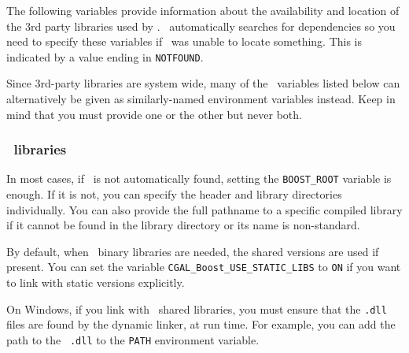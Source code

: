 The following variables provide information about the availability and
location of the 3rd party libraries used by \cgal. \cmake\ automatically
searches for dependencies so you need to specify these variables if 
\cmake\ was unable to locate something. This is indicated by a value ending in
\texttt{NOTFOUND}.

Since 3rd-party libraries are system wide, many of the \cmake\ variables listed below can alternatively
be given as similarly-named environment variables instead. Keep in mind that you must provide one or the
other but never both.

\subsubsection{\boost\ libraries}

In most cases, if \boost\ is not automatically found, setting the \texttt{BOOST\_ROOT} 
variable is enough. If it is not, you can specify the header and library
directories individually. You can also provide the full pathname to a specific compiled library
if it cannot be found in the library directory or its name is non-standard.

By default, when \boost\ binary libraries are needed, the shared versions
are used if present. You can set the variable
\texttt{CGAL\_Boost\_USE\_STATIC\_LIBS} to \texttt{ON} if you want to link
with static versions explicitly.

On Windows, if you link with \boost\ shared libraries, you must ensure that
the \texttt{.dll} files are found by the dynamic linker, at run time. 
For example, you can add the path to the \boost\ \texttt{.dll} to the
\texttt{PATH} environment variable.

